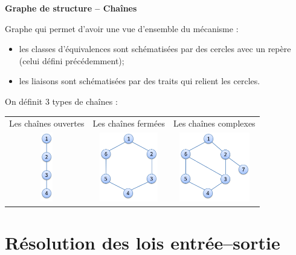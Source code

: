 \documentclass[10pt,fleqn]{article} %
\begin{document}
\begin{defi}
\textbf{Graphe de structure -- Chaînes}

Graphe qui permet d'avoir une vue d'ensemble du mécanisme :
\begin{itemize}
\item les classes d'équivalences sont schématisées par des cercles avec un repère (celui défini précédemment);
\item les liaisons sont schématisées par des traits qui relient les cercles.
\end{itemize}

On définit 3 types de chaînes :
\begin{center}
\begin{tabular}{ccc}
Les chaînes ouvertes & Les chaînes fermées & Les chaînes complexes \\
\includegraphics[height=3cm]{images/co.png}
&
\includegraphics[height=3cm]{images/cf.png}
&
\includegraphics[height=3cm]{images/cc.png}\\
\end{tabular}
\end{center}
\end{defi}


\section{Résolution des lois entrée--sortie}
\end{document}
